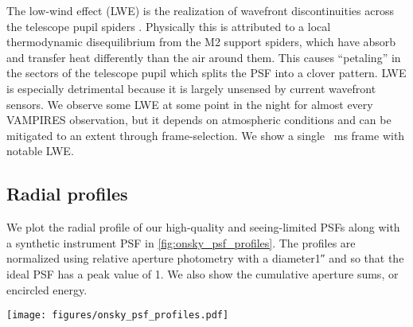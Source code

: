 The low-wind effect (LWE) is the realization of wavefront discontinuities across the telescope pupil spiders  \citep{cantalloube_origin_2018}. Physically this is attributed to a local thermodynamic disequilibrium from the M2 support spiders, which have absorb and transfer heat differently than the air around them. This causes ``petaling'' in the sectors of the telescope pupil which splits the PSF into a clover pattern. LWE is especially detrimental because it is largely unsensed by current wavefront sensors. We observe some LWE at some point in the night for almost every VAMPIRES observation, but it depends on atmospheric conditions and can be mitigated to an extent through frame-selection. We show a single \SI{}{\milli\second} frame with notable LWE.

\subsection{Radial profiles}
We plot the radial profile of our high-quality and seeing-limited PSFs along with a synthetic instrument PSF in \autoref{fig:onsky_psf_profiles}. The profiles are normalized using relative aperture photometry with a  diameter\ang{;;1} and so that the ideal PSF has a peak value of 1. We also show the cumulative aperture sums, or encircled energy.
\begin{figure*}
    \centering
    \texttt{[image: figures/onsky\_psf\_profiles.pdf]}
    \caption{\label{fig:onsky_psf_profiles}}
\end{figure*}
